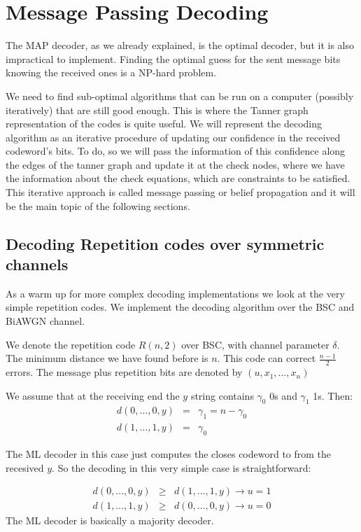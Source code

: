 \chapter{Message Passing Decoding}

The MAP decoder, as we already explained, is the optimal decoder, but it is also impractical to implement. Finding the optimal guess for the sent message bits knowing the received ones is a NP-hard problem.

We need to find sub-optimal algorithms that can be run on a computer (possibly iteratively) that are still good enough. This is where the Tanner graph representation of the codes is quite useful. We will represent the decoding algorithm as an iterative procedure of updating our confidence in the received codeword's bits. To do, so we will pass the information of this confidence along the edges of the tanner graph and update it at the check nodes, where we have the information about the check equations, which are constraints to be satisfied. This iterative approach is called message passing or belief propagation and it will be the main topic of the following sections.

\section{Decoding Repetition codes over symmetric channels}
As a warm up for more complex decoding implementations we look at the very simple repetition codes. We implement the decoding algorithm over the BSC and BiAWGN channel. 

We denote the repetition code $R(n, 2)$ over BSC, with channel parameter $\delta$. The minimum distance we have found before is $n$. This code can correct $\frac{n-1}{2}$ errors. The message plus repetition bits are denoted by $(u, x_1, \dots, x_n)$ 

We assume that at the receiving end the $y$ string contains $\gamma_0$ 0s and $\gamma_1$ 1s. Then:
\begin{eqnarray}
	d(0, \dots, 0, y) &=& \gamma_1  = n-\gamma_0 \\
	d(1, \dots, 1, y) &=& \gamma_0
\end{eqnarray}

The ML decoder in this case just computes the closes codeword to from the recesived $y$. So the decoding in this very simple case is straightforward:

\begin{eqnarray}
	d(0, \dots, 0, y) &\ge& d(1, \dots, 1, y) \rightarrow u = 1 \\
	d(1, \dots, 1, y) &\ge& d(0, \dots, 0, y) \rightarrow u = 0
\end{eqnarray}
The ML decoder is basically a majority decoder.


